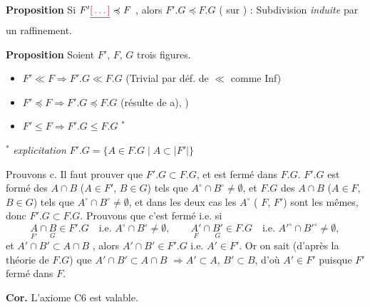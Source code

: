 \documentclass[11pt,a4paper]{article}
\begin{document}
\textbf{Proposition} Si $F' \struck{\ill{}} \preccurlyeq F$ \struck{\ill{}}, alors $F'.G \preccurlyeq F.G$ ( sur \ill{}) : Subdivision \emph{induite} par un raffinement.

\textbf{Proposition} Soient $F'$, $F$, $G$ trois figures.
\begin{itemize}
  \item[a)] $F' \ll F \Longrightarrow F'.G \ll F.G$ \quad (Trivial par déf. de $\ll$ comme Inf)
  \item[b)] $F' \preccurlyeq F \Longrightarrow F'.G \preccurlyeq F.G$ \quad (résulte de a), \ill{} \ill{})
  \item[c)] $F' \leq F \Longrightarrow F'.G \leq F.G$ $^{*}$
\end{itemize}
$^{*}$ \emph{explicitation} $F'.G = \{A \in F.G \mid A \subset |F'|\}$

Prouvons c. Il faut prouver que  $F'.G \subset F.G$, et est fermé dans $F.G$.  $F'.G$ est formé des $A \cap B$ ($A \in F'$, $B \in G$) tels que $A^{\circ} \cap B^{\circ} \neq \emptyset$, et $F.G$ des $A \cap B$ ($A \in F$, $B \in G$) tels que $A^{\circ} \cap B^{\circ} \neq \emptyset$, et dans les deux cas les \ill{} \ill{} $A^{\circ}$ ( \ill{} $F$, \ill{} $F'$) sont les mêmes, donc $F'.G \subset F.G$. Prouvons que c'est fermé i.e. si  
\[
  \underset{F'}{A} \cap \underset{G}{B} \in F'.G \quad \text{i.e. } A^{\circ} \cap B^{\circ} \neq \emptyset, \qquad
  \underset{F}{A'} \cap \underset{G}{B'} \in F.G \quad \text{i.e. } A'^{\circ} \cap B'^{\circ} \neq \emptyset,
\]
et $A' \cap B' \subset A \cap B$ \struck{\ill{}}, alors $A' \cap B' \in F'.G$ i.e. $A' \in F'$. Or on sait (d'après la théorie de $F.G$) que $A' \cap B' \subset A \cap B$ $\Longrightarrow A' \subset A$, $B' \subset B$, d'où $A' \in F'$ puisque $F'$ fermé dans $F$.

\textbf{Cor.} L'axiome C6 est valable.

\end{document}
